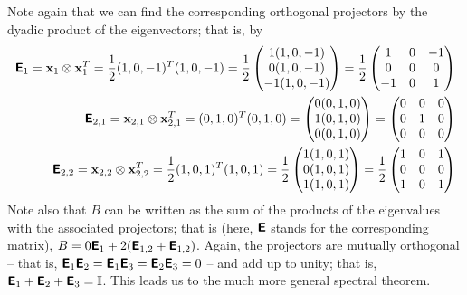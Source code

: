 {Note again that we can find the corresponding orthogonal projectors by the dyadic product
of the eigenvectors; that is,  by
\begin{equation}
\begin{split}
\textsf{\textbf{E}}_1 =
{\bf x}_1 \otimes {\bf x}_1^T =
\frac{1}{2} (1,0,-1)^T(1,0,-1) =
\frac{1}{2}
\begin{pmatrix}
1(1,0,-1)\\
0(1,0,-1)\\
-1(1,0,-1)
\end{pmatrix} =
\frac{1}{2}
\begin{pmatrix}
1&0&-1\\
0&0&0\\
-1&0&1
\end{pmatrix}
\\
\textsf{\textbf{E}}_{2,1} =
{\bf x}_{2,1} \otimes {\bf x}_{2,1}^T =
(0,1,0)^T(0,1,0) =
\begin{pmatrix}
0(0,1,0)\\
1(0,1,0)\\
0(0,1,0)
\end{pmatrix} =
\begin{pmatrix}
0&0&0\\
0&1&0\\
0&0&0
\end{pmatrix}
\\
\textsf{\textbf{E}}_{2,2} =
{\bf x}_{2,2} \otimes {\bf x}_{2,2}^T =
\frac{1}{2} (1,0,1)^T(1,0,1) =
\frac{1}{2}
\begin{pmatrix}
1(1,0,1)\\
0(1,0,1)\\
1(1,0,1)
\end{pmatrix} =
\frac{1}{2}
\begin{pmatrix}
1&0&1\\
0&0&0\\
1&0&1
\end{pmatrix}
\end{split}
\end{equation}
Note also that $B$ can be written as the sum of the products of the
eigenvalues with the associated projectors; that is (here, $\textsf{\textbf{E}}$
stands for the corresponding matrix),
$B= 0  \textsf{\textbf{E}}_1 + 2 (\textsf{\textbf{E}}_{1,2} + \textsf{\textbf{E}}_{1,2} )$.
Again, the projectors are mutually orthogonal
-- that is,
$\textsf{\textbf{E}}_1 \textsf{\textbf{E}}_2 = \textsf{\textbf{E}}_1\textsf{\textbf{E}}_3=\textsf{\textbf{E}}_2\textsf{\textbf{E}}_3=0$
--
and add up to unity; that is,
$\textsf{\textbf{E}}_1+\textsf{\textbf{E}}_2+\textsf{\textbf{E}}_3={\Bbb I}$.
This leads us to the much more general spectral theorem.

}
